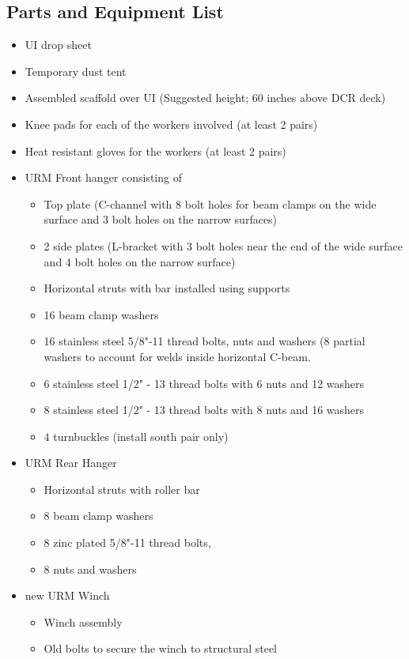\documentclass[11pt]{article}
\begin{document}
\subsection{Parts and Equipment List}
\begin{itemize}
\item UI drop sheet
\item Temporary dust tent
\item Assembled scaffold over UI (Suggested height; 60 inches above DCR deck)
\item Knee pads for each of the workers involved (at least 2 pairs)
\item Heat resistant gloves for the workers (at least 2 pairs)
\item URM Front hanger consisting of
	\begin{itemize}
	\item Top plate (C-channel with 8 bolt holes for beam clamps on the wide surface and 3 bolt holes on the narrow surfaces)
	\item 2 side plates (L-bracket with 3 bolt holes near the end of the wide surface and 4 bolt holes on the narrow surface)
	\item Horizontal struts with bar installed using supports
	\item 16 beam clamp washers
	\item 16 stainless steel 5/8"-11 thread bolts, nuts and washers (8 partial washers to account for welds inside horizontal C-beam.
	\item 6 stainless steel 1/2" - 13 thread bolts  with 6 nuts and 12 washers
	\item 8 stainless steel 1/2" - 13 thread bolts  with 8 nuts and 16 washers
	\item 4 turnbuckles (install south pair only)
	\end{itemize}
\item URM Rear Hanger
	\begin{itemize}
	\item Horizontal struts with roller bar
	\item 8 beam clamp washers
	\item 8 zinc plated 5/8"-11 thread bolts, 
	\item 8 nuts and washers
	\end{itemize} 
\item new URM Winch 
	\begin{itemize}
	\item Winch assembly
	\item Old bolts to secure the winch to structural steel

\end{itemize}
\end{itemize}
\end{document}
